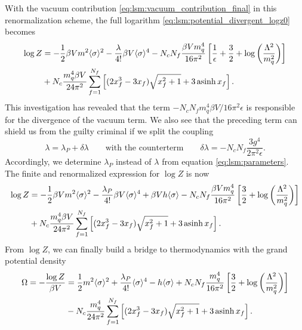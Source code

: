 With the vacuum contribution \eqref{eq:lsm:vacuum_contribution_final} in this renormalization scheme, the full logarithm \eqref{eq:lsm:potential_divergent_logz0} becomes
\begin{equation}
\begin{split}
	\log Z &= -\frac12 \beta V m^2 \langle \sigma \rangle^2 - \frac{\lambda}{4!} \beta V \langle \sigma \rangle^4 - N_c N_f \frac{\beta V m_q^4}{16 \pi^2} \left[ \frac{1}{\epsilon} + \frac{3}{2} + \log\left(\frac{{\Lambda}^2}{m_q^2}\right) \right] \\
	       &+ N_c \frac{m_q^4 \beta V}{24 \pi^2} \sum_{f=1}^{N_f} \left[ (2 x_f^3 - 3x_f) \sqrt{x_f^2 + 1} + 3 \operatorname{asinh} x_f \right] .
\end{split}
\end{equation}
This investigation has revealed that the term $-N_c N_f m_q^4 \beta V / 16 \pi^2 \epsilon$ is responsible for the divergence of the vacuum term.
We also see that the preceding term can shield us from the guilty criminal if we split the coupling 
\begin{equation}
	\lambda = \lambda_P + \delta\lambda
	\qquad \text{with the counterterm} \qquad
	\delta\lambda = -N_c N_f \frac{3 g^4}{2 \pi^2 \epsilon} .
\end{equation}
Accordingly, we determine $\lambda_P$ instead of $\lambda$ from equation \eqref{eq:lsm:parameters}.
The finite and renormalized expression for $\log Z$ is now
\begin{equation}
\begin{split}
	\log Z &= -\frac12 \beta V m^2 \langle \sigma \rangle^2 - \frac{\lambda_P}{4!} \beta V \langle \sigma \rangle^4 + \beta V h \langle \sigma \rangle - N_c N_f \frac{\beta V m_q^4}{16 \pi^2} \left[ \frac{3}{2} + \log\left(\frac{{\Lambda}^2}{m_q^2}\right) \right] \\
	       &+ N_c \frac{m_q^4 \beta V}{24 \pi^2} \sum_{f=1}^{N_f} \left[ (2 x_f^3 - 3x_f) \sqrt{x_f^2 + 1} + 3 \operatorname{asinh} x_f \right] .
\end{split}
\end{equation}
From $\log Z$, we can finally build a bridge to thermodynamics with the grand potential density
\begin{equation}
\begin{split}
	\Omega = -\frac{\log Z}{\beta V} &= \frac12 m^2 \langle \sigma \rangle^2 + \frac{\lambda_P}{4!} \langle \sigma \rangle^4 - h \langle \sigma \rangle + N_c N_f \frac{m_q^4}{16 \pi^2} \left[ \frac{3}{2} + \log\left(\frac{{\Lambda}^2}{m_q^2}\right) \right] \\
	                                 &- N_c \frac{m_q^4}{24 \pi^2} \sum_{f=1}^{N_f} \left[ (2 x_f^3 - 3x_f) \sqrt{x_f^2 + 1} + 3 \operatorname{asinh} x_f \right] .
\end{split}
\end{equation}

